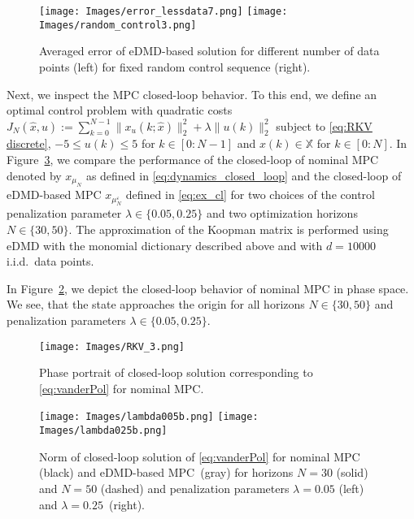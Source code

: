 \documentclass{article}
\numberwithin{equation}{section}
\newcommand{\bX}{\mathbb X}
\begin{document}
	\begin{figure}[htb]
		\centering
		\texttt{[image: Images/error\_lessdata7.png]} \texttt{[image: Images/random\_control3.png]}
		\caption{Averaged error of eDMD-based solution for different number of data points (left) for fixed random control sequence (right).
		}
		\label{fig:openloop}
	\end{figure}
	
	\noindent Next, we inspect the MPC closed-loop behavior. To this end, we define an optimal control problem with quadratic costs $J_N(\hat{x},u) := \sum_{k=0}^{N - 1} \|x_u(k;\hat{x})\|_2^2 + \lambda\|u(k)\|_2^2$ subject to \eqref{eq:RKV discrete}, $-5 \leq u(k) \leq 5$ for $k \in [0:N-1]$ and $x(k)\in \bX$ for $k \in [0:N]$. In Figure~\ref{fig:MPC RKV}, we compare the performance of the closed-loop of nominal MPC denoted by $x_{\mu_N}$ as defined in \eqref{eq:dynamics_closed_loop}
	and the closed-loop of eDMD-based MPC $x_{\mu_N^\varepsilon}$ defined in \eqref{eq:ex_cl} for two choices of the control penalization parameter $\lambda \in \lbrace 0.05, 0.25\rbrace$ and two optimization horizons $N \in \lbrace 30, 50\rbrace$. The approximation of the Koopman matrix is performed using eDMD with the monomial dictionary described above and with $d = 10000$ i.i.d.\ data points. %
	
	In Figure~\ref{fig:phase portrait}, we depict the closed-loop behavior of nominal MPC in phase space. We see, that the state approaches the origin for all horizons $N\in\{30,50\}$ and penalization parameters $\lambda \in \{0.05,0.25\}$.
	\begin{figure}[htb]
		\centering
		\texttt{[image: Images/RKV\_3.png]}
		\caption{Phase portrait of closed-loop solution corresponding to \eqref{eq:vanderPol} for nominal MPC.}
		\label{fig:phase portrait}
	\end{figure}
	
	\begin{figure}[htb]
		\centering
		\texttt{[image: Images/lambda005b.png]}    \texttt{[image: Images/lambda025b.png]}
		\caption{Norm of closed-loop solution of \eqref{eq:vanderPol} for nominal MPC (black) and eDMD-based MPC~(gray) for horizons $N = 30$ (solid) and $N = 50$ (dashed) and penalization parameters $\lambda = 0.05$ (left) and $\lambda = 0.25$~(right).}%
		\label{fig:MPC RKV}
	\end{figure}
	
\end{document}
